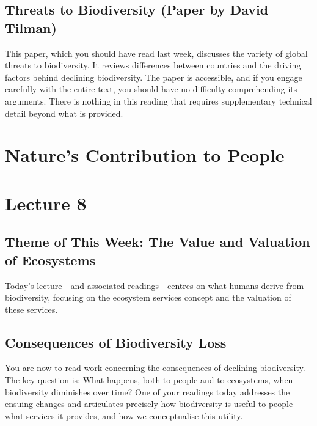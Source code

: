 \documentclass[
  10pt,
]{book}
\begin{document}
\section{Threats to Biodiversity (Paper by David
Tilman)}\label{threats-to-biodiversity-paper-by-david-tilman}

This paper, which you should have read last week, discusses the variety
of global threats to biodiversity. It reviews differences between
countries and the driving factors behind declining biodiversity. The
paper is accessible, and if you engage carefully with the entire text,
you should have no difficulty comprehending its arguments. There is
nothing in this reading that requires supplementary technical detail
beyond what is provided.

\chapter{Nature's Contribution to
People}\label{natures-contribution-to-people}

\chapter*{Lecture 8}\label{lecture-8}

\section{Theme of This Week: The Value and Valuation of
Ecosystems}\label{theme-of-this-week-the-value-and-valuation-of-ecosystems}

Today's lecture---and associated readings---centres on what humans
derive from biodiversity, focusing on the ecosystem services concept and
the valuation of these services.

\section{Consequences of Biodiversity
Loss}\label{consequences-of-biodiversity-loss}

You are now to read work concerning the consequences of declining
biodiversity. The key question is: What happens, both to people and to
ecosystems, when biodiversity diminishes over time? One of your readings
today addresses the ensuing changes and articulates precisely how
biodiversity is useful to people---what services it provides, and how we
conceptualise this utility.
\end{document}
